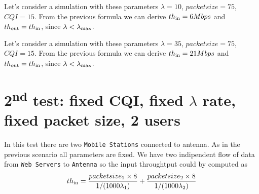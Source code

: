 Let's consider a simulation with these parameters \(\lambda = 10\), \(packetsize=75\), \(CQI=15\). From the previous formula we can derive \(th\textsubscript{in} = 6 Mbps\) and \(th\textsubscript{out} = th\textsubscript{in}\), since \( \lambda < \lambda\textsubscript{max}\).

Let's consider a simulation with these parameters \(\lambda =35\), \(packetsize=75\), \(CQI=15\). From the previous formula we can derive \(th\textsubscript{in} = 21 Mbps\) and \(th\textsubscript{out} = th\textsubscript{in}\), since \( \lambda < \lambda\textsubscript{max}\).

\section{2\textsuperscript{nd} test: fixed CQI, fixed \(\lambda\) rate, fixed packet size, 2 users}
In this test there are two \texttt{Mobile Stations} connected to antenna. As in the previous scenario all parameters are fixed. We have two indipendent flow of data from \texttt{Web Servers} to \texttt{Antenna} so the input throughtput could by computed as
\[ th\textsubscript{in} = \frac{packetsize\textsubscript{1} \times 8}{1/(1000\lambda\textsubscript{1})} + \frac{packetsize\textsubscript{2} \times 8}{1/(1000\lambda\textsubscript{2})}\]
